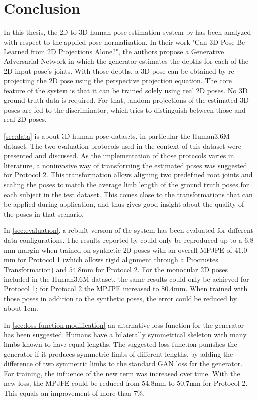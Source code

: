 \section{Conclusion}
In this thesis, the 2D to 3D human pose estimation system by \citet{drover18} has been analyzed with respect to the applied pose normalization.
In their work "Can 3D Pose Be Learned from 2D Projections Alone?", the authors propose a Generative Adversarial Network in which the generator estimates the depths for each of the 2D input pose's joints.
With those depths, a 3D pose can be obtained by re-projecting the 2D pose using the perspective projection equation.
The core feature of the system is that it can be trained solely using real 2D poses.
No 3D ground truth data is required.
For that, random projections of the estimated 3D poses are fed to the discriminator, which tries to distinguish between those and real 2D poses.

\autoref{sec:data} is about 3D human pose datasets, in particular the Human3.6M \cite{ionescu14} dataset.
The two evaluation protocols used in the context of this dataset were presented and discussed.
As the implementation of those protocols varies in literature, a noninvasive way of transforming the estimated poses was suggested for Protocol 2.
This transformation allows aligning two predefined root joints and scaling the poses to match the average limb length of the ground truth poses for each subject in the test dataset.
This comes close to the transformations that can be applied during application, and thus gives good insight about the quality of the poses in that scenario.

In \autoref{sec:evaluation}, a rebuilt version of the system has been evaluated for different data configurations.
The results reported by \citet{drover18} could only be reproduced up to a $6.8$mm margin when trained on synthetic 2D poses with an overall MPJPE of $41.0$mm for Protocol 1 (which allows rigid alignment through a Procrustes Transformation) and $54.8$mm for Protocol 2.
For the monocular 2D poses included in the Human3.6M dataset, the same results could only be achieved for Protocol 1; for Protocol 2 the MPJPE increased to $80.4$mm.
When trained with those poses in addition to the synthetic poses, the error could be reduced by about $1$cm.

In \autoref{sec:loss-function-modification} an alternative loss function for the generator has been suggested.
Humans have a bilaterally symmetrical skeleton with many limbs known to have equal lengths.
The suggested loss function punishes the generator if it produces symmetric limbs of different lengths, by adding the difference of two symmetric limbs to the standard GAN loss for the generator.
For training, the influence of the new term was increased over time.
With the new loss, the MPJPE could be reduced from $54.8$mm to $50.7$mm for Protocol 2.
This equals an improvement of more than $7\%$.

